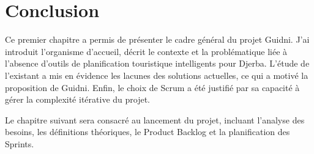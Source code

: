 \section*{Conclusion}

Ce premier chapitre a permis de présenter le cadre général du projet Guidni. J'ai introduit
l'organisme d'accueil, décrit le contexte et la problématique liée à l'absence d'outils de
planification touristique intelligents pour Djerba. L'étude de l'existant a mis en évidence
les lacunes des solutions actuelles, ce qui a motivé la proposition de Guidni. Enfin, le choix
de Scrum a été justifié par sa capacité à gérer la complexité itérative du projet.

Le chapitre suivant sera consacré au lancement du projet, incluant l'analyse des besoins, les
définitions théoriques, le Product Backlog et la planification des Sprints.
